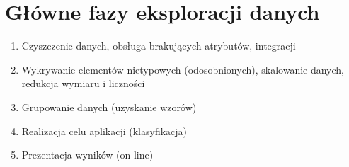 \section{Główne fazy eksploracji danych}
\begin{enumerate}
    \item Czyszczenie danych, obsługa brakujących atrybutów, integracji
    \item Wykrywanie elementów nietypowych (odosobnionych), skalowanie danych, redukcja wymiaru i liczności
    \item Grupowanie danych (uzyskanie wzorów)
    \item Realizacja celu aplikacji (klasyfikacja)
    \item Prezentacja wyników (on-line)
    
\end{enumerate}